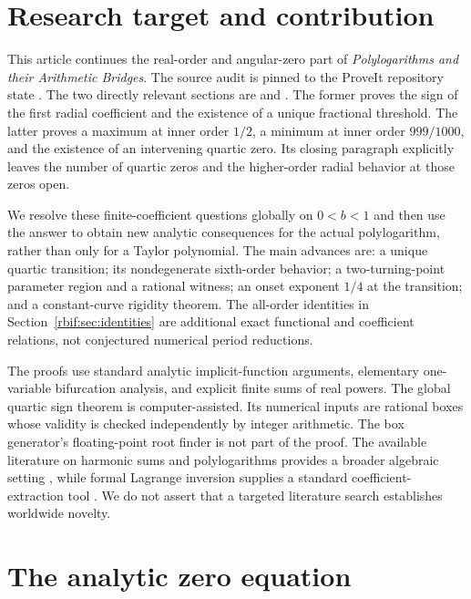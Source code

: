 \documentclass[11pt,a4paper]{article}
\theoremstyle{definition}\newtheorem{definition}[theorem]{Definition}
\theoremstyle{remark}\newtheorem{remark}[theorem]{Remark}
\numberwithin{equation}{section}
\begin{document}
\section{Research target and contribution}
\label{rbif:sec:overview}
This article continues the real-order and angular-zero part of
\emph{Polylogarithms and their Arithmetic Bridges}. The source audit is
pinned to the ProveIt repository state
.
The two directly relevant sections are
 and 
\cite{rbif:local,rbif:turning}. The former proves the sign of the first
radial coefficient and the existence of a unique fractional threshold.
The latter proves a maximum at inner order $1/2$, a minimum at inner order
$999/1000$, and the existence of an intervening quartic zero. Its closing
paragraph explicitly leaves the number of quartic zeros and the
higher-order radial behavior at those zeros open.

We resolve these finite-coefficient questions globally on $0<b<1$ and
then use the answer to obtain new analytic consequences for the actual
polylogarithm, rather than only for a Taylor polynomial. The main advances
are: a unique quartic transition; its nondegenerate sixth-order behavior;
a two-turning-point parameter region and a rational witness; an onset
exponent $1/4$ at the transition; and a constant-curve rigidity theorem.
The all-order identities in Section~\ref{rbif:sec:identities} are additional
exact functional and coefficient relations, not conjectured numerical
period reductions.

The proofs use standard analytic implicit-function arguments, elementary
one-variable bifurcation analysis, and explicit finite sums of real powers.
The global quartic sign theorem is computer-assisted. Its numerical inputs
are rational boxes whose validity is checked independently by integer
arithmetic. The box generator's floating-point root finder is not part of
the proof. The available literature on harmonic sums and polylogarithms
provides a broader algebraic setting \cite{rbif:abl}, while formal Lagrange
inversion supplies a standard coefficient-extraction tool
\cite{rbif:gessel}. We do not assert that a targeted literature search
establishes worldwide novelty.

\section{The analytic zero equation}
\label{rbif:sec:equation}
\end{document}
